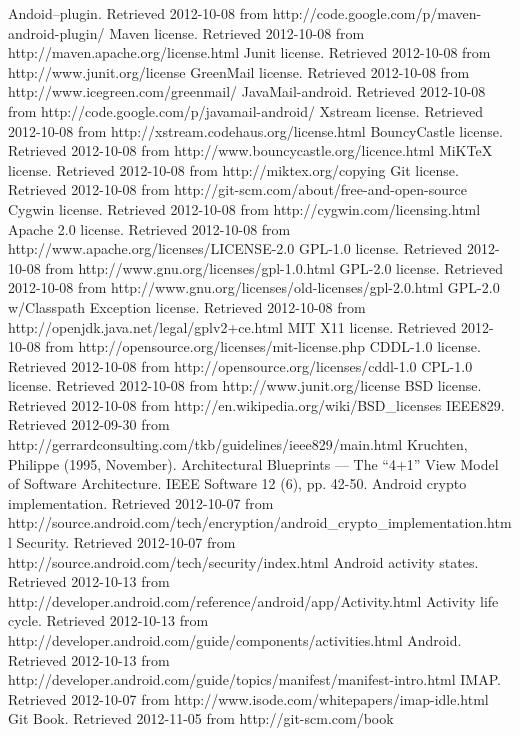 \documentclass[12pt]{report}
\begin{document}
\begin{thebibliography}{99}
 Andoid--plugin. Retrieved 2012-10-08 from http://code.google.com/p/maven-android-plugin/
 Maven license. Retrieved 2012-10-08 from http://maven.apache.org/license.html
 Junit license. Retrieved 2012-10-08 from http://www.junit.org/license
 GreenMail license. Retrieved 2012-10-08 from http://www.icegreen.com/greenmail/
 JavaMail-android. Retrieved 2012-10-08 from http://code.google.com/p/javamail-android/
 Xstream license. Retrieved 2012-10-08 from http://xstream.codehaus.org/license.html
 BouncyCastle license. Retrieved 2012-10-08 from http://www.bouncycastle.org/licence.html
 MiKTeX license. Retrieved 2012-10-08 from http://miktex.org/copying
 Git license. Retrieved 2012-10-08 from http://git-scm.com/about/free-and-open-source
 Cygwin license. Retrieved 2012-10-08 from http://cygwin.com/licensing.html
 Apache 2.0 license. Retrieved 2012-10-08 from http://www.apache.org/licenses/LICENSE-2.0
 GPL-1.0 license. Retrieved 2012-10-08 from http://www.gnu.org/licenses/gpl-1.0.html
 GPL-2.0 license. Retrieved 2012-10-08 from http://www.gnu.org/licenses/old-licenses/gpl-2.0.html
 GPL-2.0 w/Classpath Exception license. Retrieved 2012-10-08 from http://openjdk.java.net/legal/gplv2+ce.html
 MIT X11 license. Retrieved 2012-10-08 from http://opensource.org/licenses/mit-license.php
 CDDL-1.0 license. Retrieved 2012-10-08 from http://opensource.org/licenses/cddl-1.0
 CPL-1.0 license. Retrieved 2012-10-08 from http://www.junit.org/license
 BSD license. Retrieved 2012-10-08 from http://en.wikipedia.org/wiki/BSD\_licenses
 IEEE829. Retrieved  2012-09-30 from http://gerrardconsulting.com/tkb/guidelines/ieee829/main.html
 Kruchten, Philippe (1995, November). Architectural Blueprints — The “4+1” View Model of Software Architecture. IEEE Software 12 (6), pp. 42-50.
 Android crypto implementation. Retrieved 2012-10-07 from http://source.android.com/tech/encryption/android\_crypto\_implementation.html
 Security. Retrieved 2012-10-07 from http://source.android.com/tech/security/index.html
 Android activity states. Retrieved 2012-10-13 from http://developer.android.com/reference/android/app/Activity.html
 Activity life cycle. Retrieved 2012-10-13 from http://developer.android.com/guide/components/activities.html
 Android. Retrieved 2012-10-13 from http://developer.android.com/guide/topics/manifest/manifest-intro.html
 IMAP. Retrieved 2012-10-07 from http://www.isode.com/whitepapers/imap-idle.html
 Git Book. Retrieved 2012-11-05 from http://git-scm.com/book
\end{thebibliography}
\end{document}
